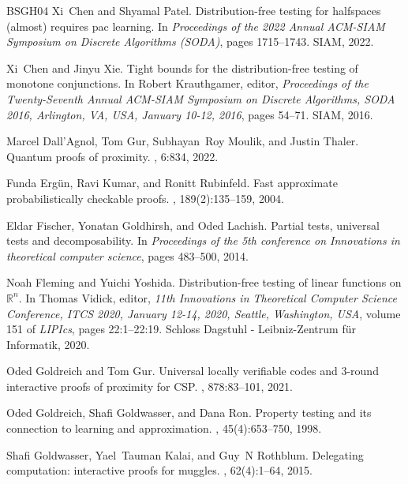\documentclass[10pt,a4paper]{article}
\begin{document}
\begin{thebibliography}{BSGH{\etalchar{+}}04}
Xi~Chen and Shyamal Patel.
\newblock Distribution-free testing for halfspaces (almost) requires pac
  learning.
\newblock In {\em Proceedings of the 2022 Annual ACM-SIAM Symposium on Discrete
  Algorithms (SODA)}, pages 1715--1743. SIAM, 2022.

Xi~Chen and Jinyu Xie.
\newblock Tight bounds for the distribution-free testing of monotone
  conjunctions.
\newblock In Robert Krauthgamer, editor, {\em Proceedings of the Twenty-Seventh
  Annual {ACM-SIAM} Symposium on Discrete Algorithms, {SODA} 2016, Arlington,
  VA, USA, January 10-12, 2016}, pages 54--71. {SIAM}, 2016.

Marcel Dall'Agnol, Tom Gur, Subhayan~Roy Moulik, and Justin Thaler.
\newblock Quantum proofs of proximity.
, 6:834, 2022.

Funda Erg{\"{u}}n, Ravi Kumar, and Ronitt Rubinfeld.
\newblock Fast approximate probabilistically checkable proofs.
, 189(2):135--159, 2004.

Eldar Fischer, Yonatan Goldhirsh, and Oded Lachish.
\newblock Partial tests, universal tests and decomposability.
\newblock In {\em Proceedings of the 5th conference on Innovations in
  theoretical computer science}, pages 483--500, 2014.

Noah Fleming and Yuichi Yoshida.
\newblock Distribution-free testing of linear functions on $\mathbb{R}^n$.
\newblock In Thomas Vidick, editor, {\em 11th Innovations in Theoretical
  Computer Science Conference, {ITCS} 2020, January 12-14, 2020, Seattle,
  Washington, {USA}}, volume 151 of {\em LIPIcs}, pages 22:1--22:19. Schloss
  Dagstuhl - Leibniz-Zentrum f{\"{u}}r Informatik, 2020.

Oded Goldreich and Tom Gur.
\newblock Universal locally verifiable codes and 3-round interactive proofs of
  proximity for {CSP}.
, 878:83--101, 2021.

Oded Goldreich, Shafi Goldwasser, and Dana Ron.
\newblock Property testing and its connection to learning and approximation.
, 45(4):653--750, 1998.

Shafi Goldwasser, Yael~Tauman Kalai, and Guy~N Rothblum.
\newblock Delegating computation: interactive proofs for muggles.
, 62(4):1--64, 2015.


\end{thebibliography}
\end{document}
